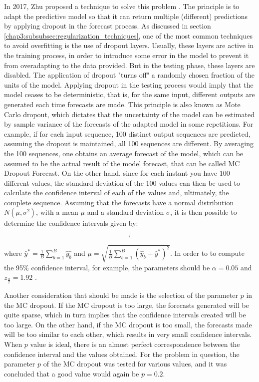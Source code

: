 In 2017, Zhu proposed a technique to solve this problem \cite{uber}. The principle is to adapt the predictive model so that it can return multiple (different) predictions by applying dropout in the forecast process. As discussed in section \ref{chap3:subsubsec:regularization_techniques}, one of the most common techniques to avoid overfitting is the use of dropout layers. Usually, these layers are active in the training process, in order to introduce some error in the model to prevent it from overadapting to the data provided. But in the testing phase, these layers are disabled. The application of dropout "turns off" a randomly chosen fraction of the units of the model. Applying dropout in the testing process would imply that the model ceases to be deterministic, that is, for the same input, different outputs are generated each time forecasts are made. 
This principle is also known as Mote Carlo \cite{uber2} dropout, which dictates that the uncertainty of the model can be estimated by sample variance of the forecasts of the adapted model in some repetitions. For example, if for each input sequence, 100 distinct output sequences are predicted, assuming the dropout is maintained, all 100 sequences are different. By averaging the 100 sequences, one obtains an average forecast of the model, which can be assumed to be the actual result of the model forecast, that can be called MC Dropout Forecast. On the other hand, since for each instant you have 100 different values, the standard deviation of the 100 values can then be used to calculate the confidence interval of each of the values and, ultimately, the complete sequence. Assuming that the forecasts have a normal distribution $N(\mu, \sigma^2)$, with a mean $\mu$ and a standard deviation $\sigma$, it is then possible to determine the confidence intervals given by: 

\begin{equation}
    [\hat{y}^* - z_{\frac{\alpha}{2}}\mu,\ \hat{y}^* + z_{\frac{\alpha}{2}}\mu], 
\end{equation}

where $\hat{y}^* = \frac{1}{B}\sum_{b=1}^B\hat{y_b}$ and $\mu = \sqrt{\frac{1}{B}\sum_{b=1}^B(\hat{y_b} -\hat{y}^*)^2}$. In order to to compute the 95\% confidence interval, for example, the parameters should be $\alpha=0.05$ and $z_{\frac{\alpha}{2}}= 1.92$ . 

Another consideration that should be made is the selection of the parameter $p$ in the MC dropout. If the MC dropout is too large, the forecasts generated will be quite sparse, which in turn implies that the confidence intervals created will be too large. On the other hand, if the MC dropout is too small, the forecasts made will be too similar to each other, which results in very small confidence intervals. When $p$ value is ideal, there is an almost perfect correspondence between the confidence interval and the values obtained. For the problem in question, the parameter $p$ of the MC dropout was tested for various values, and it was concluded that a good value would again be $p = 0.2$.

